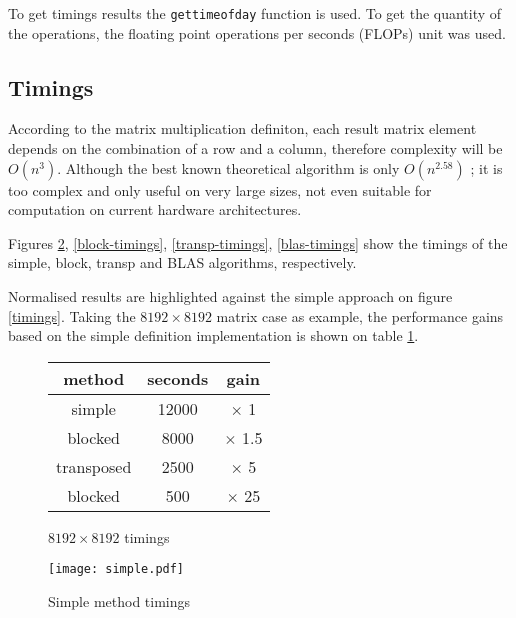 \documentclass[a4paper,twocolumn]{article}
\begin{document}
To get timings results the {\tt gettimeofday} function is used. To get the 
quantity of the operations, the floating point operations per seconds (FLOPs) 
unit was used.

\subsection{Timings}

According to the matrix multiplication definiton, each result matrix element 
depends on the combination of a row and a column, therefore complexity will 
be $ O(n^{3}) $.
Although the best known theoretical algorithm is only $ O(n^{2.58}) $ 
\cite{algorithm}; it is too complex and only useful on very large sizes, 
not even suitable for computation on current hardware architectures.

\smallskip

Figures \ref{simple-timings}, \ref{block-timings}, \ref{transp-timings}, 
\ref{blas-timings} show the timings of the simple, block, transp and BLAS 
algorithms, respectively.

\smallskip

Normalised results are highlighted against the simple approach on figure 
\ref{timings}.
Taking the $ 8192 \times 8192 $ matrix case as example, the performance gains 
based on the simple definition implementation is shown on table \ref{table}.

\begin{figure}[H]
  \begin{center}
    \begin{tabular}{|c|c|c|}\hline
      {\bf method} & {\bf seconds} & {\bf gain} \\ \hline
      simple & 12000 & $ \times $ 1 \\ \hline
      blocked & 8000 & $ \times $ 1.5 \\ \hline
      transposed & 2500 & $ \times $ 5 \\ \hline
      blocked & 500 & $ \times $ 25 \\ \hline
    \end{tabular}
    \caption{$ 8192 \times 8192 $ timings}
  \end{center}
  \label{table}
\end{figure}

\begin{center}
  \begin{figure}[H]
    \texttt{[image: simple.pdf]}
    \caption{Simple method timings}
    \label{simple-timings}
  \end{figure}
\end{center}
\end{document}
